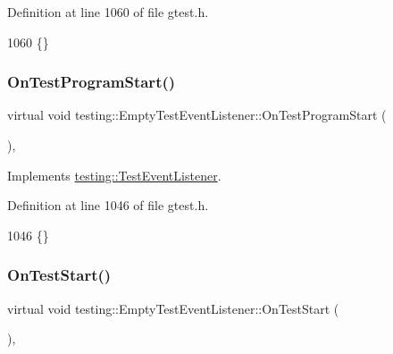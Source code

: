Definition at line 1060 of file gtest.\+h.


\begin{DoxyCode}
1060 \{\}
\end{DoxyCode}
\mbox{\label{classtesting_1_1EmptyTestEventListener_aa3847c8a3c22d8d69a6006dfdd6589fc}} 
\subsubsection{\texorpdfstring{On\+Test\+Program\+Start()}{OnTestProgramStart()}}
{\footnotesize\ttfamily virtual void testing\+::\+Empty\+Test\+Event\+Listener\+::\+On\+Test\+Program\+Start (\begin{DoxyParamCaption}\item[{const \hyperlink{classtesting_1_1UnitTest}{Unit\+Test} \&}]{ }\end{DoxyParamCaption})\hspace{0.3cm}{\ttfamily [inline]}, {\ttfamily [virtual]}}



Implements \hyperlink{classtesting_1_1TestEventListener_a5f6c84f39851e8a603a2d2e10063816b}{testing\+::\+Test\+Event\+Listener}.



Definition at line 1046 of file gtest.\+h.


\begin{DoxyCode}
1046 \{\}
\end{DoxyCode}
\mbox{\label{classtesting_1_1EmptyTestEventListener_a84fa74cc9ba742f9f847ea405ca84e5e}} 
\subsubsection{\texorpdfstring{On\+Test\+Start()}{OnTestStart()}}
{\footnotesize\ttfamily virtual void testing\+::\+Empty\+Test\+Event\+Listener\+::\+On\+Test\+Start (\begin{DoxyParamCaption}\item[{const \hyperlink{classtesting_1_1TestInfo}{Test\+Info} \&}]{ }\end{DoxyParamCaption})\hspace{0.3cm}{\ttfamily [inline]}, {\ttfamily [virtual]}}



